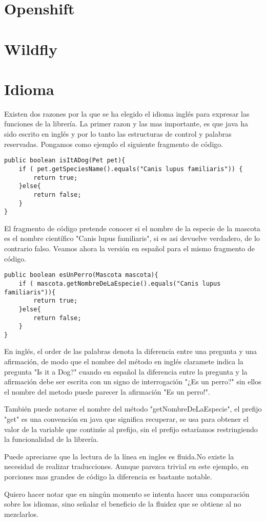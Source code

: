 	\section{Openshift}

	\section{Wildfly}

	\section{Idioma}

		Existen dos razones por la que se ha elegido el idioma inglés para expresar las funciones de la librería. La primer razon y las mas importante, es que java ha sido escrito en inglés y por lo tanto las estructuras de control y palabras reservadas. Pongamos como ejemplo el siguiente fragmento de código.

\begin{lstlisting}
public boolean isItADog(Pet pet){
	if ( pet.getSpeciesName().equals("Canis lupus familiaris")) {
		return true;
	}else{
		return false;
	}
}
\end{lstlisting}

	El fragmento de código pretende conocer si el nombre de la especie de la mascota es el nombre científico "Canis lupus familiaris", si es asi devuelve verdadero, de lo contrario falso. Veamos ahora la versión en español para el mismo fragmento de código.

\begin{lstlisting}
public boolean esUnPerro(Mascota mascota){
	if ( mascota.getNombreDeLaEspecie().equals("Canis lupus familiaris")){
		return true;
	}else{
		return false;
	}
}
\end{lstlisting}

	En inglés, el order de las palabras denota la diferencia entre una pregunta y una afirmación, de modo que el nombre del método en inglés claramete indica la pregunta "Is it a Dog?" cuando en español la diferencia entre la pregunta y la afirmación debe ser escrita con un signo de interrogación "¿Es un perro?" sin ellos el nombre del metodo puede parecer la afirmación "Es un perro!".

	También puede notarse el nombre del método "getNombreDeLaEspecie", el prefijo "get" es una convención en java que significa recuperar, se usa para obtener el valor de la variable que continúe al prefijo, sin el prefijo estaríamos restringiendo la funcionalidad de la librería.

	Puede apreciarse que la lectura de la línea en ingles es fluida.No existe la necesidad de realizar traducciones. Aunque parezca trivial en este ejemplo, en porciones mas grandes de código la diferencia es bastante notable.

	Quiero hacer notar que en ningún momento se intenta hacer una comparación sobre los idiomas, sino señalar el beneficio de la fluidez que se obtiene al no mezclarlos.